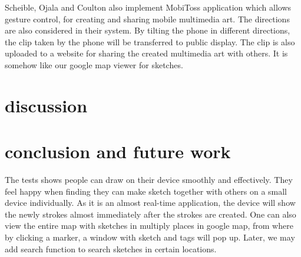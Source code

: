 \documentclass{chi2009}
\begin{document}
Scheible, Ojala and Coulton \cite{mobitoss:scheible} also implement MobiToss application which allows gesture control, for creating and sharing mobile multimedia art. The directions are also considered in their system. By tilting the phone in different directions, the clip taken by the phone will be transferred to public display. The clip is also uploaded to a website for sharing the created multimedia art with others. It is somehow like our google map viewer for sketches.

\section{discussion}

\section{conclusion and future work}
The tests shows people can draw on their device smoothly and effectively. They feel happy when finding they can make sketch together with others on a small device individually. As it is an almost real-time application, the device will show the newly strokes almost immediately after the strokes are created. One can also view the entire map with sketches in multiply places in google map, from where by clicking a marker, a window with sketch and tags will pop up. Later, we may add search function to search sketches in certain locations.




\end{document}
